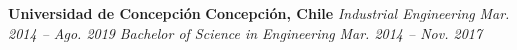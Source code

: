 \item
\headerrow
{\textbf{Universidad de Concepción}}
{\textbf{Concepción, Chile}}
\headerrow
{\emph{Industrial Engineering}}
{\emph{Mar. 2014 -- Ago. 2019}}
\headerrow
{\emph{Bachelor of Science in Engineering}}
{\emph{Mar. 2014 -- Nov. 2017}}
